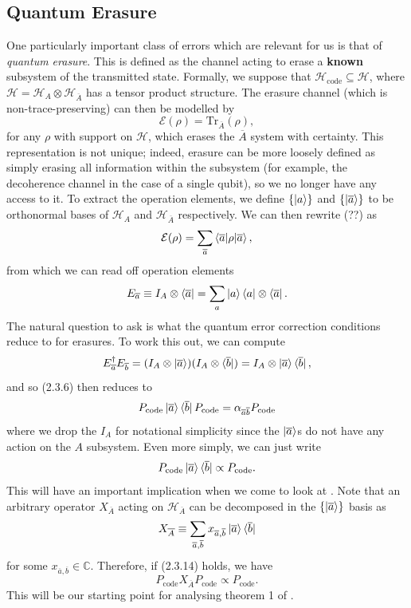 \documentclass[12pt,a4paper]{report}
\numberwithin{equation}{section}
\newcommand{\ketbra}[2]{\ket{#1}\bra{#2}}
\newcommand{\ketbras}[1]{\ketbra{#1}{#1}}
\newcommand{\Pc}{P_{\text{code}}}
\newcommand{\Hcode}{\mathcal{H}_{\text{code}}}
\newcommand{\ol}[1]{\overline{#1}}
\theoremstyle{definition}
\theoremstyle{theorem}
\theoremstyle{theorem}
\theoremstyle{example}
\theoremstyle{definition}
\begin{document}
\subsection{Quantum Erasure}
One particularly important class of errors which are relevant for us is that of \textit{quantum erasure}. This is defined as the channel acting to erase a \textbf{known} subsystem of the transmitted state. Formally, we suppose that $\Hcode\subseteq\mathcal{H}$, where $\mathcal{H}=\mathcal{H}_{A}\otimes\mathcal{H}_{\ol{A}}$ has a tensor product structure. The erasure channel (which is non-trace-preserving) can then be modelled by
\begin{equation}
	\mathcal{E}(\rho)=\text{Tr}_{\ol{A}}(\rho),
\end{equation} 
for any $\rho$ with support on $\mathcal{H}$, which erases the $\ol{A}$ system with certainty. This representation is not unique; indeed, erasure can be more loosely defined as simply erasing all information within the subsystem (for example, the decoherence channel in the case of a single qubit), so we no longer have any access to it. To extract the operation elements, we define $\{\ket{a}\}$ and $\{\ket{\ol{a}}\}$ to be orthonormal bases of $\mathcal{H}_{A}$ and $\mathcal{H}_{\ol{A}}$ respectively. We can then rewrite (??) as
\begin{equation}
	\mathcal{E}(\rho)=\sum_{\ol{a}}\braket{\ol{a}|\rho|\ol{a}},
\end{equation}
from which we can read off operation elements
\begin{equation}
	E_{\ol{a}}\equiv I_{A}\otimes\bra{\ol{a}}=\sum_{a}\ketbras{a}\otimes\bra{\ol{a}}.
\end{equation}
The natural question to ask is what the quantum error correction conditions reduce to for erasures. To work this out, we can compute
\begin{equation}
	E_{\ol{a}}^{\dagger}E_{\ol{b}}=(I_{A}\otimes\ket{\ol{a}})(I_{A}\otimes\bra{\ol{b}})=I_{A}\otimes\ketbra{\ol{a}}{\ol{b}},
\end{equation}
and so (2.3.6) then reduces to
\begin{equation}
	\Pc\ketbra{\ol{a}}{\ol{b}}\Pc=\alpha_{\ol{a}\ol{b}}\Pc
\end{equation}
where we drop the $I_{A}$ for notational simplicity since the $\ket{\ol{a}}$s do not have any action on the $A$ subsystem. Even more simply, we can just write
\begin{equation}
	\Pc\ketbra{\ol{a}}{\ol{b}}\propto\Pc.
\end{equation}
This will have an important implication when we come to look at \cite{Harlow}. Note that an arbitrary operator $X_{\ol{A}}$ acting on $\mathcal{H}_{\ol{A}}$ can be decomposed in the $\{\ket{\ol{a}}\}$ basis as
\begin{equation}
	X_{\ol{A}}\equiv \sum_{\ol{a},\ol{b}}x_{\ol{a},\ol{b}}\ketbra{\ol{a}}{\ol{b}}
\end{equation}
for some $x_{\ol{a},\ol{b}}\in\mathbb{C}$. Therefore, if (2.3.14) holds, we have
\begin{equation}
	\Pc X_{\ol{A}}\Pc\propto\Pc.
\end{equation}
This will be our starting point for analysing theorem 1 of \cite{Harlow}.
\end{document}
